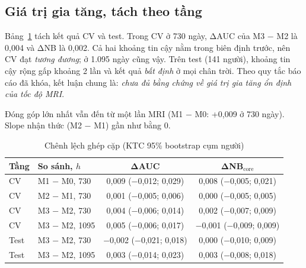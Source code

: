 \documentclass[conference]{IEEEtran}
\begin{document}
\subsection{Giá trị gia tăng, tách theo tầng}
Bảng~\ref{tab:delta} tách kết quả CV và test. Trong CV ở 730 ngày, ΔAUC của M3 − M2 là 0,004 và ΔNB là 0,002. Cả hai khoảng tin cậy nằm trong biên định trước, nên CV đạt \emph{tương đương}; ở 1.095 ngày cũng vậy. Trên test (141 người), khoảng tin cậy rộng gấp khoảng 2 lần và kết quả \emph{bất định} ở mọi chân trời. Theo quy tắc báo cáo đã khóa, kết luận chung là: \emph{chưa đủ bằng chứng về giá trị gia tăng ổn định của tốc độ MRI}.

Đóng góp lớn nhất vẫn đến từ một lần MRI (M1 − M0: +0,009 ở 730 ngày). Slope nhận thức (M2 − M1) gần như bằng 0.

\begin{table}[t]
\caption{Chênh lệch ghép cặp (KTC 95\% bootstrap cụm người)}\setlength{\tabcolsep}{3pt}
\label{tab:delta}
\centering\footnotesize
\begin{tabular}{@{}llcc@{}}
\toprule
Tầng & So sánh, $h$ & ΔAUC & ΔNB$_{\text{core}}$\\
\midrule
CV & M1 − M0, 730 & 0,009 (−0,012; 0,029) & 0,008 (−0,005; 0,021)\\
CV & M2 − M1, 730 & 0,001 (−0,005; 0,006) & 0,000 (−0,005; 0,005)\\
CV & M3 − M2, 730 & 0,004 (−0,006; 0,014) & 0,002 (−0,007; 0,009)\\
CV & M3 − M2, 1095 & 0,005 (−0,006; 0,017) & −0,001 (−0,009; 0,009)\\
Test & M3 − M2, 730 & −0,002 (−0,021; 0,018) & 0,000 (−0,010; 0,009)\\
Test & M3 − M2, 1095 & 0,003 (−0,014; 0,023) & 0,003 (−0,008; 0,018)\\
\bottomrule
\end{tabular}
\end{table}
\end{document}
